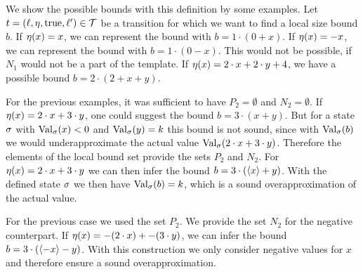 
We show the possible bounds with this definition by some examples.
Let $t = (\ell,\eta,\text{true},\ell') \in \mathcal{T}$ be a transition for which we want to find a local size bound $b$.
If $\eta(x) = x$, we can represent the bound with $b = 1 \cdot (0 + x)$.
If $\eta(x) = -x$, we can represent the bound with $b = 1 \cdot (0 - x)$.
This would not be possible, if $N_1$ would not be a part of the template.
If $\eta(x) = 2 \cdot x + 2 \cdot y + 4$, we have a possible bound $b = 2 \cdot (2 + x + y)$.

For the previous examples, it was sufficient to have $P_2 = \emptyset$ and $N_2 = \emptyset$.
If $\eta(x) = 2 \cdot x + 3 \cdot y$, one could suggest the bound $b = 3 \cdot (x + y)$.
But for a state $\sigma$ with $\text{Val}_{\sigma}(x) < 0$ and $\text{Val}_{\sigma}(y) = k$ this bound is not sound, since with $\text{Val}_{\sigma}(b)$ we would underapproximate the actual value $\text{Val}_{\sigma}(2 \cdot x + 3 \cdot y)$.
Therefore the elements of the local bound set provide the sets $P_2$ and $N_2$.
For $\eta(x) = 2 \cdot x + 3 \cdot y$ we can then infer the bound $b = 3 \cdot (\langle x\rangle + y)$.
With the defined state $\sigma$ we then have $\text{Val}_{\sigma}(b) = k$, which is a sound overapproximation of the actual value. 

For the previous case we used the set $P_2$.
We provide the set $N_2$ for the negative counterpart.
If $\eta(x) = -(2 \cdot x) + -(3 \cdot y)$, we can infer the bound $b = 3 \cdot (\langle-x\rangle - y)$.
With this construction we only consider negative values for $x$ and therefore ensure a sound overapproximation.

